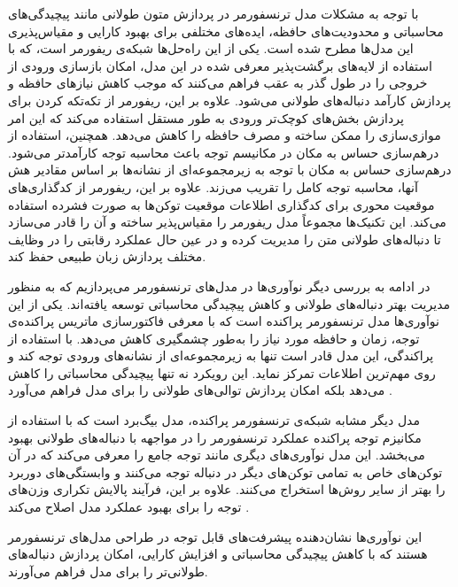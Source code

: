 با توجه به مشکلات مدل ترنسفورمر در پردازش متون طولانی مانند پیچیدگی‌های محاسباتی و محدودیت‌های حافظه، ایده‌های مختلفی برای بهبود کارایی و مقیاس‌پذیری این مدل‌ها مطرح شده است. یکی از این راه‌حل‌ها شبکه‌ی ریفورمر است، که با استفاده از لایه‌های برگشت‌پذیر معرفی شده در این مدل، امکان بازسازی ورودی از خروجی را در طول گذر به عقب فراهم می‌کنند که موجب کاهش نیازهای حافظه و پردازش کارآمد دنباله‌های طولانی می‌شود. علاوه بر این، ریفورمر از تکه‌تکه کردن برای پردازش بخش‌های کوچک‌تر ورودی به طور مستقل استفاده می‌کند که این امر موازی‌سازی را ممکن ساخته و مصرف حافظه را کاهش می‌دهد. همچنین، استفاده از درهم‌سازی حساس به مکان در مکانیسم توجه باعث محاسبه توجه کارآمدتر می‌شود. درهم‌سازی حساس به مکان با توجه به زیرمجموعه‌ای از نشانه‌ها بر اساس مقادیر هش آنها، محاسبه توجه کامل را تقریب می‌زند. علاوه بر این، ریفورمر از کدگذاری‌های موقعیت محوری برای کدگذاری اطلاعات موقعیت توکن‌ها به صورت فشرده استفاده می‌کند. این تکنیک‌ها مجموعاً مدل ریفورمر را مقیاس‌پذیر ساخته و آن را قادر می‌سازد تا دنباله‌های طولانی متن را مدیریت کرده و در عین حال عملکرد رقابتی را در وظایف مختلف پردازش زبان طبیعی حفظ کند\cite{reformer}.

در ادامه به بررسی دیگر نوآوری‌ها در مدل‌های ترنسفورمر می‌پردازیم که به منظور مدیریت بهتر دنباله‌های طولانی و کاهش پیچیدگی محاسباتی توسعه یافته‌اند. یکی از این نوآوری‌ها مدل ترنسفورمر پراکنده است که با معرفی فاکتورسازی ماتریس پراکنده‌ی توجه، زمان و حافظه مورد نیاز را به‌طور چشمگیری کاهش می‌دهد. با استفاده از پراکندگی، این مدل قادر است تنها به زیرمجموعه‌ای از نشانه‌های ورودی توجه کند و روی مهم‌ترین اطلاعات تمرکز نماید. این رویکرد نه تنها پیچیدگی محاسباتی را کاهش می‌دهد بلکه امکان پردازش توالی‌های طولانی‌ را برای مدل فراهم می‌آورد \cite{child2019generating}.

مدل دیگر مشابه شبکه‌ی ترنسفورمر پراکنده، مدل بیگ‌برد است که با استفاده از مکانیزم توجه پراکنده عملکرد ترنسفورمر را در مواجهه با دنباله‌های طولانی بهبود می‌بخشد. این مدل نوآوری‌های دیگری مانند توجه جامع را معرفی می‌کند که در آن توکن‌های خاص به تمامی توکن‌های دیگر در دنباله توجه می‌کنند و وابستگی‌های دوربرد را بهتر از سایر روش‌ها استخراج می‌کنند. علاوه بر این، فرآیند پالایش تکراری وزن‌های توجه را برای بهبود عملکرد مدل اصلاح می‌کند \cite{zaheer2020big}.

این نوآوری‌ها نشان‌دهنده پیشرفت‌های قابل توجه در طراحی مدل‌های ترنسفورمر هستند که با کاهش پیچیدگی محاسباتی و افزایش کارایی، امکان پردازش دنباله‌های طولانی‌تر را برای مدل فراهم می‌آورند\cite{zaheer2020big}. 


